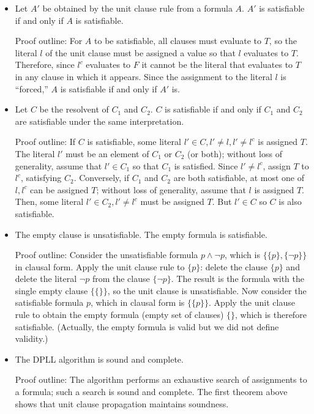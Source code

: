 \documentclass[11pt]{report}
\begin{document}
\begin{itemize}

\item Let $A'$ be obtained by the unit clause rule from a formula $A$.
$A'$ is satisfiable if and only if $A$ is satisfiable.

Proof outline: For $A$ to be satisfiable, all clauses must evaluate to
$T$, so the literal $l$ of the unit clause must be assigned a value so
that $l$ evaluates to $T$. Therefore, since $l^c$ evaluates to $F$ it
cannot be the literal that evaluates to $T$ in any clause in which it
appears. Since the assignment to the literal $l$ is ``forced,'' $A$ is
satisfiable if and only if $A'$ is.

\item Let $C$ be the resolvent of $C_1$ and $C_2$. $C$ is satisfiable if
and only if $C_1$ and $C_2$ are satisfiable under the same
interpretation.

Proof outline: If $C$ is satisfiable, some literal $l'\in C, l'\neq l,
l' \neq l^c$ is assigned $T$. The literal $l'$ must be an element of
$C_1$ or $C_2$ (or both); without loss of generality, assume that $l'\in
C_1$ so that $C_1$ is satisfied. Since $l'\neq l^c$, assign $T$ to
$l^c$, satisfying $C_2$. Conversely, if $C_1$ and $C_2$ are both
satisfiable, at most one of $l,l^c$ can be assigned $T$; without loss of
generality, assume that $l$ is assigned $T$. Then, some literal $l'\in
C_2, l'\neq l^c$ must be assigned $T$. But $l'\in C$ so $C$ is also
satisfiable.

\item The empty clause is unsatisfiable. The empty formula is
satisfiable.

Proof outline: Consider the unsatisfiable formula $p \wedge \neg p$,
which is $\{\{p\}, \{\neg p\}\}$ in clausal form. Apply the unit clause
rule to $\{p\}$: delete the clause $\{p\}$ and delete the literal $\neg
p$ from the clause $\{\neg p\}$. The result is the formula with the
single empty clause $\{\{\}\}$, so the unit clause is unsatisfiable. Now
consider the satisfiable formula $p$, which in clausal form is
$\{\{p\}\}$. Apply the unit clause rule to obtain the empty formula
(empty set of clauses) $\{\}$, which is therefore satisfiable.
(Actually, the empty formula is valid but we did not define validity.)

\item The DPLL algorithm is sound and complete.

Proof outline: The algorithm performs an exhaustive search of
assignments to a formula; such a search is sound and complete. The first
theorem above shows that unit clause propagation maintains soundness.

\end{itemize}
\end{document}
